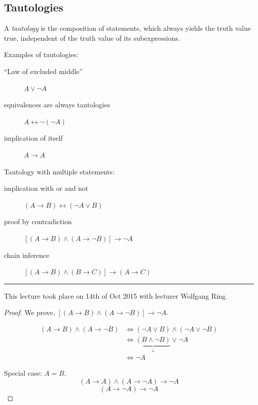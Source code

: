 \documentclass[a4paper,landscape,twocolumn]{article}
\newcommand\meta[3]{\hrule{} This #1 took place on #2 with lecturer #3.\par}
\begin{document}
\subsection{Tautologies}
%
A \emph{tautology} is the composition of statements, which always yields the truth value
true, independent of the truth value of its subexpressions.

Examples of tautologies:
\begin{description}
  \item[\enquote{Law of excluded middle}] $A \lor \neg A$
  \item[equivalences are always tautologies] $A \leftrightarrow \neg (\neg A)$
  \item[implication of itself] $A \rightarrow A$
\end{description}

Tautology with multiple statements:
\begin{description}
  \item[implication with or and not] $(A \rightarrow B) \leftrightarrow (\neg A \lor B)$
  \item[proof by contradiction] $\left[(A \rightarrow B) \land (A \rightarrow \neg B)\right] \rightarrow \neg A$
  \item[chain inference] $\left[(A \rightarrow B) \land (B \rightarrow C)\right] \rightarrow (A \rightarrow C)$
\end{description}


\meta{lecture}{14th of Oct 2015}{Wolfgang Ring}

\begin{proof}
  We prove, $\left[(A \rightarrow B) \land (A \rightarrow \neg B)\right] \rightarrow \neg A$.

  \begin{align*}
    (A \rightarrow B) \land (A \rightarrow \neg B) &\iff (\neg A \lor B) \land (\neg A \lor \neg B) \\
      &\iff \underbrace{(B \land \neg B)}_{\bot} \lor \neg A \\
      &\iff \neg A
  \end{align*}

  Special case: $A = B$.
  \[ (A \rightarrow A) \land (A \rightarrow \neg A) \rightarrow \neg A \]
  \[ (A \rightarrow \neg A) \rightarrow \neg A \]
\end{proof}
\end{document}
